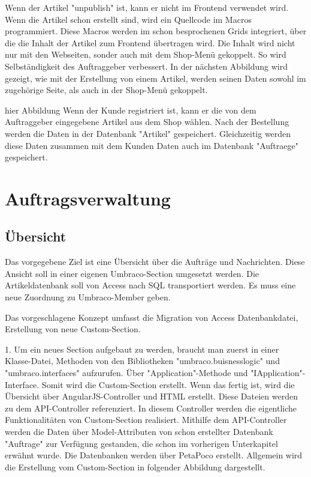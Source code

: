 Wenn der Artikel "unpublish" ist, kann er nicht im Frontend verwendet wird. Wenn die Artikel schon erstellt sind, wird ein Quellcode im Macros programmiert. Diese Macros werden im schon besprochenen Grids integriert, über die die Inhalt der Artikel zum Frontend übertragen wird. 
Die Inhalt wird nicht nur mit den Webseiten, sonder auch mit dem Shop-Menü gekoppelt. So wird Selbständigkeit des Auftraggeber verbessert. In der nächsten Abbildung wird gezeigt, wie mit der Erstellung von einem Artikel, werden seinen Daten sowohl im zugehörige Seite, als auch in der Shop-Menü gekoppelt.
 
 hier Abbildung
Wenn der Kunde registriert ist, kann er die von dem Auftraggeber eingegebene Artikel aus dem Shop wählen. Nach der Bestellung werden die Daten in der Datenbank "Artikel" gespeichert. Gleichzeitig werden diese Daten zusammen mit dem Kunden Daten auch im Datenbank "Auftraege" gespeichert. 




\section{Auftragsverwaltung}
\subsection{Übersicht}

Das vorgegebene Ziel ist eine Übersicht über die Aufträge und Nachrichten. Diese Ansicht soll in einer eigenen Umbraco-Section umgesetzt werden. Die Artikeldatenbank soll von Access nach SQL transportiert werden. Es muss eine neue Zuordnung zu Umbraco-Member geben.

Das vorgeschlagene Konzept umfasst die Migration von Access Datenbankdatei, Erstellung von neue Custom-Section. 

1. Um ein neues Section aufgebaut zu werden, braucht man zuerst in einer Klasse-Datei, Methoden von den Bibliotheken "umbraco.buisnesslogic" und "umbraco.interfaces" aufzurufen. Über "Application"-Methode und "IApplication"-Interface. Somit wird die Custom-Section erstellt. Wenn das fertig ist, wird die Übersicht über AngularJS-Controller und HTML erstellt. Diese Dateien werden zu dem API-Controller referenziert. In diesem Controller werden die eigentliche Funktionalitäten von Custom-Section realisiert. Mithilfe dem API-Controller werden die Daten über Model-Attributen von schon erstellter Datenbank "Auftrage" zur Verfügung gestanden, die schon im vorherigen Unterkapitel erwähnt wurde. Die Datenbanken werden über PetaPoco erstellt. Allgemein wird die Erstellung vom Custom-Section in folgender Abbildung dargestellt.

